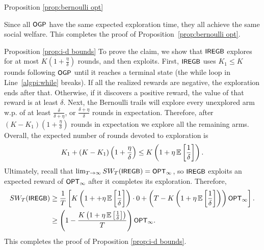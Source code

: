 \begin{proofof}{Proposition \ref{prop:bernoulli opt}}
\iffalse
\begin{algorithm}[t]
\renewcommand{\algorithmiccomment}[1]{\texttt{\kibitz{blue}{\##1}}}
\caption{$\SEGB$ for Two-Supported Distributions \label{alg:alg of pi two supported}}
\begin{algorithmic}[1]
\STATE $s\gets A$
\WHILE[$s$ is not a terminal state] {$\OGP(s)\neq \emptyset$\label{algpi:two:while}}{
\STATE select $\OGP(s)$, and denote the realized action by $a_k$.\label{algpi:two:play with ogp} \COMMENT{if $\below(s)=\emptyset$, prioritize the arms in $\above(s)$ according to the stochastic order}
\IF[a reward of $H$ was realized]{$x_{a_k}>0$} {
		\STATE \textbf{break}. 
}
\ENDIF
\STATE $s\gets s\setminus \{a_k\}$.\label{algpi:two:update s}
}
\ENDWHILE
\IF{$x(a_k)=H$ for some explored arm $a_k$}{
\STATE exploit $a_k$ forever.
}
\ELSE{
\STATE exploit $a_0$ forever.
}
\ENDIF
\end{algorithmic}
\end{algorithm}
\fi


Since all ${\small\textnormal{\textsf{OGP}}}$ have the same expected exploration time, they all achieve the same social welfare. This completes the proof of Proposition~\ref{prop:bernoulli opt}.
\end{proofof}

\begin{proofof}{Proposition \ref{prop:i-d bounds}}
To prove the claim, we show that $\SEGB$ explores for at most $K(1+\frac{\eta}{\delta})$ rounds, and then exploits. First, $\SEGB$ uses $K_1 \leq K$ rounds following ${\small\textnormal{\textsf{OGP}}}$ until it reaches a terminal state (the while loop in Line~\ref{algpi:while} breaks). If all the realized rewards are negative, the exploration ends after that. Otherwise, if it discovers a positive reward, the value of that reward is at least $\delta$. Next, the Bernoulli trails will explore every unexplored arm w.p. of at least $ \frac{\delta}{\delta+\eta}$, or $ \frac{\delta+\eta}{\delta}$ rounds in expectation. Therefore, after $(K-K_1)(1+\frac{\eta}{\delta})$ rounds in expectation we explore all the remaining arms. Overall, the expected number of rounds devoted to exploration is
\[
K_1 + (K-K_1)\left(1+\frac{\eta}{\delta}\right) \leq K \left(1+\eta\operatorname{\mathbb{E}}\left[{\frac{1}{\delta}}\right]\right).
\]
Ultimately, recall that $\lim_{T \rightarrow \infty }SW_T({\small\textnormal{\textsf{IREGB}}}) = {\small\textnormal{\textsf{OPT}}}_{\infty}$, so $\SEGB$ exploits an expected reward of ${\small\textnormal{\textsf{OPT}}}_{\infty}$ after it completes its exploration. Therefore,
\begin{align*}
SW_T({\small\textnormal{\textsf{IREGB}}})& \geq  \frac{1}{T} \left[K \left(1++\eta\operatorname{\mathbb{E}}\left[{\frac{1}{\delta}}\right]\right) \cdot 0 + \left(T-K \left(1+\eta\operatorname{\mathbb{E}}\left[{\frac{1}{\delta}}\right]\right) \right){\small\textnormal{\textsf{OPT}}}_{\infty}\right]. \\
&\geq\left(1-\frac{K \left(1+\eta\operatorname{\mathbb{E}}\left[{\frac{1}{\delta}}\right]\right)}{T} \right){\small\textnormal{\textsf{OPT}}}_{\infty}. 
\end{align*}
This completes the proof of Proposition \ref{prop:i-d bounds}.
\end{proofof}
